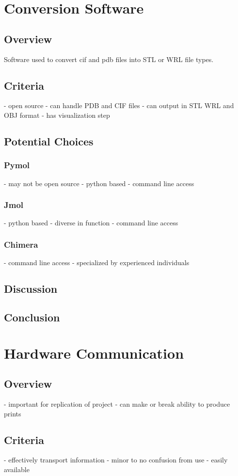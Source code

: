 \documentclass[onecolumn, draftclsnofoot,10pt, compsoc]{IEEEtran}
\begin{document}
\section{Conversion Software}
	\subsection{Overview}
	Software used to convert cif and pdb files into STL or WRL file types.
	\subsection{Criteria}
	- open source
	- can handle PDB and CIF files
	- can output in STL WRL and OBJ format
	- has visualization step
	\subsection{Potential Choices}
		\subsubsection{Pymol}
			- may not be open source
			- python based
			- command line access
		\subsubsection{Jmol}
			- python based
			- diverse in function
			- command line access
		\subsubsection{Chimera}
			- command line access
			- specialized by experienced individuals	
	\subsection{Discussion}
	\subsection{Conclusion}

\section{Hardware Communication}
	\subsection{Overview}
	- important for replication of project
	- can make or break ability to produce prints
	\subsection{Criteria}
	- effectively transport information
	- minor to no confusion from use
	- easily available
\end{document}
